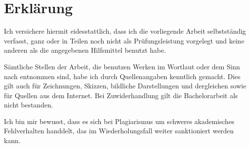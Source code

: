 \chapter*{Erklärung}
Ich versichere hiermit eidesstattlich, dass ich die vorliegende Arbeit
selbstständig verfasst, ganz oder in Teilen noch nicht als
Prüfungsleistung vorgelegt und keine anderen als die angegebenen
Hilfsmittel benutzt habe.

Sämtliche Stellen der Arbeit, die benutzen Werken im Wortlaut oder dem
Sinn nach entnommen sind, habe ich durch Quellenangaben kenntlich
gemacht. Dies gilt auch für Zeichnungen, Skizzen, bildliche
Darstellungen und dergleichen sowie für Quellen aus dem Internet. Bei
Zuwiderhandlung gilt die Bachelorarbeit als nicht bestanden.

Ich bin mir bewusst, dass es sich bei Plagiarismus um schweres
akademisches Fehlverhalten handdelt, das im Wiederholungsfall weiter
sanktioniert werden kann.

{
    \vskip3cm
    \par\noindent\makebox[7cm]{\hrulefill} \hfill\makebox[7cm]{\hrulefill}
    \par\noindent{}      \hfill{}
}
